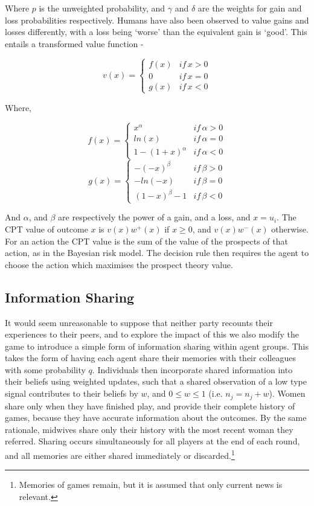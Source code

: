 Where $p$ is the unweighted probability, and $\gamma$ and $\delta$
are the weights for gain and loss probabilities respectively. Humans
have also been observed to value gains and losses differently, with
a loss being `worse' than the equivalent gain is `good'. This
entails a transformed value function -

\[
v(x)=\begin{cases}
f(x) & if\, x>0\\
0 & if\, x=0\\
g(x) & if\, x<0
\end{cases}
\]


Where,

\[
f(x)=\begin{cases}
x^{\alpha} & if\,\alpha>0\\
ln(x) & if\,\alpha=0\\
1-(1+x)^{\alpha} & if\,\alpha<0
\end{cases}
\]
\[
g(x)=\begin{cases}
-(-x)^{\beta} & if\,\beta>0\\
-ln(-x) & if\,\beta=0\\
(1-x)^{\beta}-1 & if\,\beta<0
\end{cases}
\]


And $\alpha$, and $\beta$ are respectively the power of a gain,
and a loss, and \(x=u_{i}\). The \ac{CPT} value of outcome $x$ is $v(x)w^{+}(x)$
if $x\geq0$, and $v(x)w^{-}(x)$ otherwise. For an action the \ac{CPT}
value is the sum of the value of the prospects of that action, as
in the Bayesian risk model. The decision rule then requires the agent
to choose the action which maximises the prospect theory value.

\subsection{Information Sharing}
\label{sub:info_sharing}

It would seem unreasonable to suppose that neither party recounts their experiences to their peers, and to explore the impact of this we also modify the game to introduce a simple form of information sharing within agent groups. This takes the form of having each agent share their memories with their colleagues with some probability \(q\). Individuals then incorporate shared information into their beliefs using weighted updates, such that a shared observation of a low type signal contributes to their beliefs by \(w\), and \(0\leq w\leq 1\) (i.e. \(n_{j} = n_{j} + w\)).
Women share only when they have finished play, and provide their complete history of games, because they have accurate information about the outcomes. By the same rationale, midwives share only their history with the most recent woman they referred. Sharing occurs simultaneously for all players at the end of each round, and all memories are either shared immediately or discarded.\footnote{Memories of games remain, but it is assumed that only current news is relevant.}

